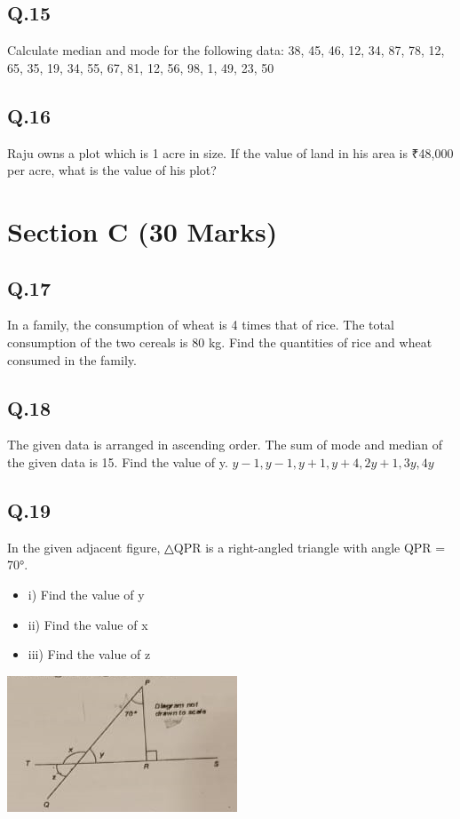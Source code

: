 \documentclass[11pt]{article}
\begin{document}
\subsection*{Q.15}
\label{sec:orgb04a432}
Calculate median and mode for the following data:
38, 45, 46, 12, 34, 87, 78, 12, 65, 35, 19, 34, 55, 67, 81, 12, 56, 98, 1, 49, 23, 50
\subsection*{Q.16}
\label{sec:orged25d50}
Raju owns a plot which is 1 acre in size. If the value of land in his area is ₹48,000 per acre, what is the value of his plot?
\section*{Section C (30 Marks)}
\label{sec:org6e15bde}

\subsection*{Q.17}
\label{sec:org5d73e89}
In a family, the consumption of wheat is 4 times that of rice. The total consumption of the two cereals is 80 kg. Find the quantities of rice and wheat consumed in the family.
\subsection*{Q.18}
\label{sec:orgff42e92}
The given data is arranged in ascending order. The sum of mode and median of the given data is 15. Find the value of y.
\(y-1, y-1, y+1, y+4, 2y+1, 3y, 4y\)
\subsection*{Q.19}
\label{sec:org76ec030}
In the given adjacent figure, △QPR is a right-angled triangle with angle QPR = 70°.
\begin{itemize}
\item i) Find the value of y
\item ii) Find the value of x
\item iii) Find the value of z
\end{itemize}
\begin{center}
\includegraphics[width=.9\linewidth]{./maths19.png}
\end{center}
\end{document}
